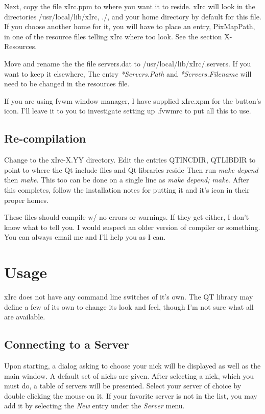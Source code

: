 \documentclass[titlepage]{article}
\begin{document}
Next, copy the file xIrc.ppm to where you want it to reside. xIrc will
look in the directories /usr/local/lib/xIrc, ./, and your home directory by
default for this file. If you choose another home for it, you will
have to place an entry, PixMapPath, in one of the resource files
telling xIrc where too look. See the section X-Resources.

Move and rename the the file servers.dat to /usr/local/lib/xIrc/.servers.
If you want to keep it elsewhere, The entry \emph{*Servers.Path} and
\emph{*Servers.Filename} will need to be changed in the resources file.

If you are using fvwm window manager, I have supplied xIrc.xpm for the
button's icon. I'll leave it to you to investigate setting up .fvwmrc
to put all this to use.

\subsection{Re-compilation}
Change to the xIrc-X.YY directory. Edit the
entries QTINCDIR, QTLIBDIR to point to where the Qt include files and Qt libraries reside
Then run \textit{make
depend} then \textit{make}. This too can be done on a single line as
\textit{make depend; make}. After this completes, follow the
installation notes for putting it and it's icon in their proper homes.

These files should compile w/ no errors or warnings. If they get
either, I don't know what to tell you. I would suspect an older
version of compiler or something. You can always email me and I'll
help you as I can.

\section{Usage}
xIrc does not have any command line switches of it's own. The QT library
may define a few of its own to change its look and feel, though I'm not sure
what all are available.

\subsection{Connecting to a Server}
Upon starting, a dialog asking to choose your nick will be displayed as
well as the main window. A default set of nicks are given. After selecting
a nick, which you must do, a table of servers will be presented. Select
your server of choice by double clicking the mouse on it. If your favorite
server is not in the list, you may add it by selecting the \emph{New} entry
under the \emph{Server} menu.
\end{document}
